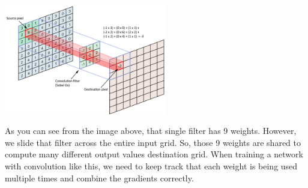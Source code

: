 \begin{center}
    \includegraphics[width=200pt]{figs/conv.png}
\end{center}

As you can see from the image above, that single filter has 9 weights. However, we slide that filter across the entire input grid. So, those 9 weights are shared to compute many different output values destination grid. When training a network with convolution like this, we need to keep track that each weight is being used multiple times and combine the gradients correctly. 

